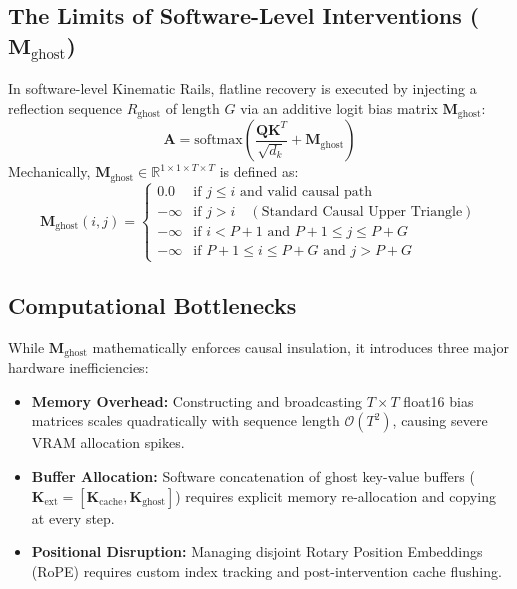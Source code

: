 \documentclass[11pt,twocolumn]{article}
\begin{document}
\begin{enumerate}
\section{The Limits of Software-Level Interventions ($\mathbf{M}_{\text{ghost}}$)}
In software-level Kinematic Rails, flatline recovery is executed by injecting a reflection sequence $R_{\text{ghost}}$ of length $G$ via an additive logit bias matrix $\mathbf{M}_{\text{ghost}}$:
\begin{equation}
\mathbf{A} = \text{softmax}\left( \frac{\mathbf{Q} \mathbf{K}^T}{\sqrt{d_k}} + \mathbf{M}_{\text{ghost}} \right)
\end{equation}
Mechanically, $\mathbf{M}_{\text{ghost}} \in \mathbb{R}^{1 \times 1 \times T \times T}$ is defined as:
\begin{equation}
\mathbf{M}_{\text{ghost}}(i, j) = \begin{cases} 
0.0 & \text{if } j \le i \text{ and valid causal path} \\
-\infty & \text{if } j > i \quad (\text{Standard Causal Upper Triangle}) \\
-\infty & \text{if } i < P+1 \text{ and } P+1 \le j \le P+G \\
-\infty & \text{if } P+1 \le i \le P+G \text{ and } j > P+G
\end{cases}
\end{equation}

\subsection{Computational Bottlenecks}
While $\mathbf{M}_{\text{ghost}}$ mathematically enforces causal insulation, it introduces three major hardware inefficiencies:
\begin{itemize}
    \item \textbf{Memory Overhead:} Constructing and broadcasting $T \times T$ float16 bias matrices scales quadratically with sequence length $\mathcal{O}(T^2)$, causing severe VRAM allocation spikes.
    \item \textbf{Buffer Allocation:} Software concatenation of ghost key-value buffers ($\mathbf{K}_{\text{ext}} = [\mathbf{K}_{\text{cache}}, \mathbf{K}_{\text{ghost}}]$) requires explicit memory re-allocation and copying at every step.
    \item \textbf{Positional Disruption:} Managing disjoint Rotary Position Embeddings (RoPE) requires custom index tracking and post-intervention cache flushing.
\end{itemize}


\end{enumerate}
\end{document}
